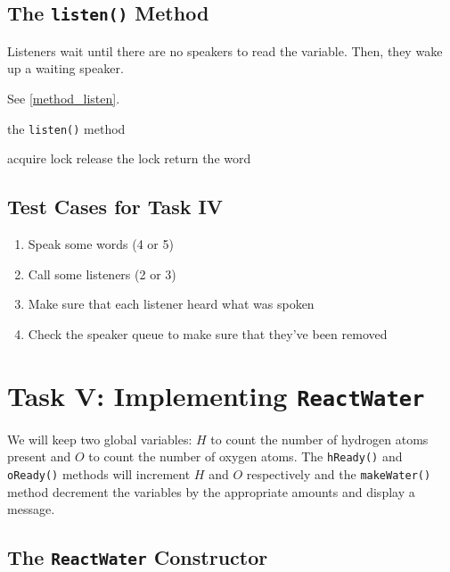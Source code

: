 \documentclass[12pt, letterpaper]{report}
\newcommand{\code}[1]{\texttt{#1}}
\begin{document}
\subsection*{The \code{listen()} Method}

Listeners wait until there are no speakers to read the variable. Then, they wake up a waiting speaker.

See \vref{method_listen}.

\begin{algorithm}[!ht]
  \caption{the \code{listen()} method}
  \label{method_listen}
    \SetAlgoLined
    acquire lock\;
    release the lock\;
    return the word\;
\end{algorithm}


\subsection*{Test Cases for Task IV}

\begin{enumerate}
\item Speak some words (4 or 5)
\item Call some listeners (2 or 3)
\item Make sure that each listener heard what was spoken
\item Check the speaker queue to make sure that they've been removed
\end{enumerate}

\section*{Task V: Implementing \code{ReactWater}}

We will keep two global variables: $H$ to count the number of hydrogen atoms present and $O$ to count the number of oxygen atoms. The \code{hReady()} and \code{oReady()} methods will increment $H$ and $O$ respectively and the \code{makeWater()} method decrement the variables by the appropriate amounts and display a message.

\subsection*{The \code{ReactWater} Constructor}
\end{document}
